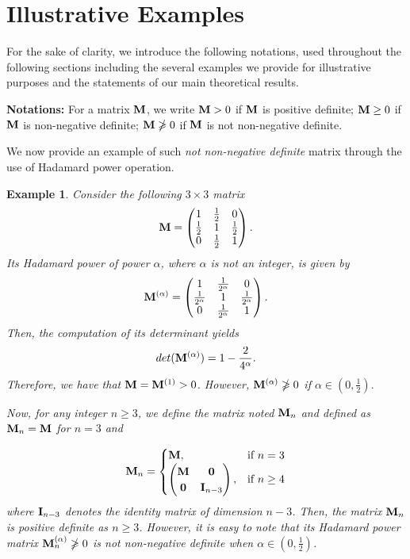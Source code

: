 \documentclass[conference,letterpaper]{IEEEtran}
\numberwithin{equation}{section}
\newcommand{\lbl}{\label}
\newcommand{\bd}{\bold}
\newcommand{\beaa}{\begin{eqnarray*}}
\newcommand{\eeaa}{\end{eqnarray*}}
\newtheorem{example}{{\sc Example}}[section]
\begin{document}
\section{Illustrative Examples}\lbl{sec:main}

For the sake of clarity, we introduce the following notations, used throughout the following sections including the several examples we provide for illustrative purposes and the statements of our main theoretical results.  

\medskip
\textbf{Notations: } For a matrix $\bd{M}$, we write $\bd{M}>0$ if $\bd{M}$ is positive definite; $\bd{M}\geq 0$ if $\bd{M}$ is non-negative definite; $\bd{M}\ngeqslant 0$ if $\bd{M}$ is not non-negative definite.

\medskip

We now provide an example of such \emph{not non-negative definite} matrix through the use of Hadamard power operation.
\medskip
\begin{example} Consider  the following $3\times 3$ matrix
\beaa
\bd{M}=
\begin{pmatrix}
1 & \frac{1}{2} & 0\\
\frac{1}{2} & 1 & \frac{1}{2}\\
0 & \frac{1}{2} & 1
\end{pmatrix}
.
\eeaa
Its Hadamard power of power $\alpha$, where $\alpha$ is not an integer, is given by
\beaa
\bd{M}^{(\alpha)}=
\begin{pmatrix}
1 & \frac{1}{2^{\alpha}} & 0\\
\frac{1}{2^{\alpha}} & 1 & \frac{1}{2^{\alpha}}\\
0 & \frac{1}{2^{\alpha}} & 1
\end{pmatrix}
.
\eeaa
 Then, the computation of its determinant yields
\beaa
\mbox{det}(\bd{M}^{(\alpha)})=1-\frac{2}{4^{\alpha}}.
\eeaa
Therefore, we have that $\bd{M}=\bd{M}^{(1)}>0$. 
However, $\bd{M}^{(\alpha)}\ngeqslant 0$ if $\alpha \in (0, \frac{1}{2}).$

Now, for any integer $n\geq 3$, we define the matrix noted $\bd{M}_n$ and defined as 
$\bd{M}_n=\bd{M}$ for $n=3$ and

\[
    \bd{M}_n= 
\begin{cases}
    \bd{M},& \text{if } n=3\\
    \begin{pmatrix}
\bd{M} & \bd{0}\\
\bd{0} & \bd{I}_{n-3}
\end{pmatrix},              & \text{if } n\geq 4
\end{cases}
\]
where $\bd{I}_{n-3}$ denotes the identity matrix of dimension $n-3$.
Then,  the matrix $\bd{M}_n$ is positive definite as $n\geq 3$. 
However, it is easy to note that its Hadamard power matrix $\bd{M}_n^{(\alpha)}\ngeqslant 0$ is not non-negative definite when $\alpha \in (0, \frac{1}{2})$.
\end{example}
\end{document}
